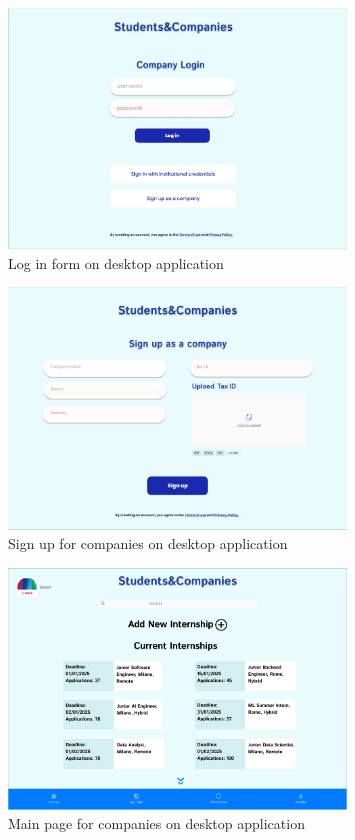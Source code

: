\clearpage

\begin{figure}[h!]
    \centering
    \includegraphics[width=0.8\textwidth]{RASD-Latex/assets/UI images/login_desktop.png}
    \caption{Log in form on desktop application}
    \label{fig:image1}
\end{figure}


\begin{figure}[h!]
    \centering
    \includegraphics[width=0.8\textwidth]{RASD-Latex/assets/UI images/signup_company_desktop.png}
    \caption{Sign up for companies on desktop application}
    \label{fig:image1}
\end{figure}


\begin{figure}[ht]
    \centering
    \includegraphics[width=0.8\textwidth]{RASD-Latex/assets/UI images/mainpage_company_desktop.png}
    \caption{Main page for companies on desktop application}
    \label{fig:image1}
\end{figure}


